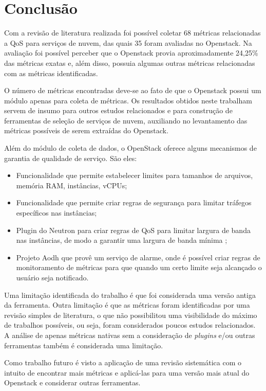 \documentclass[conference]{IEEEtran}
\begin{document}
\section{Conclusão}
Com a revisão de literatura realizada foi possível coletar 68 métricas relacionadas a QoS para serviços de nuvem, das quais
35 foram avaliadas no Openstack. Na avaliação foi possível perceber que o Openstack provia aproximadamente 24,25\% das métricas
exatas e, além disso, possuia algumas outras métricas relacionadas com as métricas identificadas.

O número de métricas encontradas deve-se ao fato de que o Openstack possui um módulo apenas para coleta de métricas. 
Os resultados obtidos neste trabalham servem de insumo para outros estudos relacionados e para construção de ferramentas de seleção de 
serviços de nuvem, auxiliando no levantamento das métricas possíveis de serem extraídas do Openstack.

Além do módulo de coleta de dados, o OpenStack oferece alguns mecanismos de garantia de qualidade de serviço. São eles:

\begin{itemize}
 \item Funcionalidade que permite estabelecer limites para tamanhos de arquivos, memória RAM, instâncias, vCPUs;
 \item Funcionalidade que permite criar regras de segurança para limitar tráfegos específicos nas instâncias;
 \item Plugin do Neutron para criar regras de QoS para limitar largura de banda nas instâncias, de modo 
 a garantir uma largura de banda mínima \cite{openstack_neutron} \cite{openstack_neutron_qos};
 \item Projeto Aodh \cite{openstack_telemetry} que provê um serviço de alarme, onde é possível criar regras de monitoramento de métricas para que 
quando um certo limite seja alcançado o usuário seja notificado.
\end{itemize}


Uma limitação identificada do trabalho é que foi considerada uma versão antiga da ferramenta. Outra limitação é que as métricas
foram identificadas por uma revisão simples de literatura, o que não possibilitou uma visibilidade do máximo de trabalhos possíveis,
ou seja, foram considerados poucos estudos relacionados. A análise de apenas métricas nativas sem a consideração de \textit{plugins} e/ou
outras ferramentas também é considerada uma limitação.

Como trabalho futuro é visto a aplicação de uma revisão sistemática com o intuito de encontrar mais métricas e aplicá-las para
uma versão mais atual do Openstack e considerar outras ferramentas.
\end{document}
